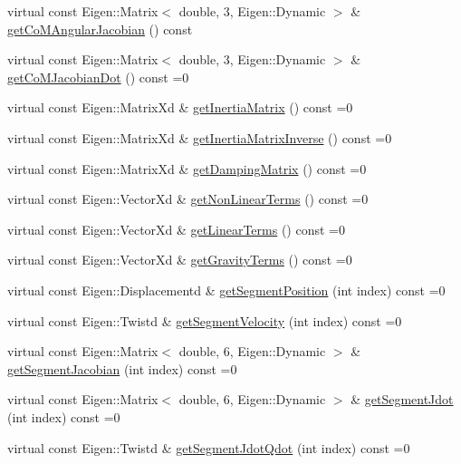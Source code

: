 \begin{DoxyCompactItemize}
\item 
virtual const Eigen\+::\+Matrix$<$ double, 3, Eigen\+::\+Dynamic $>$ \& \hyperlink{classocra_1_1Model_a24406cb7507684963e5aedb6b79940cd}{get\+Co\+M\+Angular\+Jacobian} () const
\item 
virtual const Eigen\+::\+Matrix$<$ double, 3, Eigen\+::\+Dynamic $>$ \& \hyperlink{classocra_1_1Model_abfc71fa0f52145b1df92bdbd0963c926}{get\+Co\+M\+Jacobian\+Dot} () const =0
\item 
virtual const Eigen\+::\+Matrix\+Xd \& \hyperlink{classocra_1_1Model_adf59aeee10c9d3babb05d7249bf71106}{get\+Inertia\+Matrix} () const =0
\item 
virtual const Eigen\+::\+Matrix\+Xd \& \hyperlink{classocra_1_1Model_ac1b1137365a6f6765d41d68bc02f3e62}{get\+Inertia\+Matrix\+Inverse} () const =0
\item 
virtual const Eigen\+::\+Matrix\+Xd \& \hyperlink{classocra_1_1Model_adfbe3160558dd221e7e91e2aad4d5089}{get\+Damping\+Matrix} () const =0
\item 
virtual const Eigen\+::\+Vector\+Xd \& \hyperlink{classocra_1_1Model_ac494939416d3ddcb6e5cf0ece43f3098}{get\+Non\+Linear\+Terms} () const =0
\item 
virtual const Eigen\+::\+Vector\+Xd \& \hyperlink{classocra_1_1Model_a0f9c628cb9e77d63744ccfd164e9beed}{get\+Linear\+Terms} () const =0
\item 
virtual const Eigen\+::\+Vector\+Xd \& \hyperlink{classocra_1_1Model_aef569d0c71ab76665e4a24d178e8243d}{get\+Gravity\+Terms} () const =0
\item 
virtual const Eigen\+::\+Displacementd \& \hyperlink{classocra_1_1Model_ae7afe827a1c09b99d80134a447bd9ccc}{get\+Segment\+Position} (int index) const =0
\item 
virtual const Eigen\+::\+Twistd \& \hyperlink{classocra_1_1Model_a1ee3b57487621c5194b7d6b014308e40}{get\+Segment\+Velocity} (int index) const =0
\item 
virtual const Eigen\+::\+Matrix$<$ double, 6, Eigen\+::\+Dynamic $>$ \& \hyperlink{classocra_1_1Model_a626aed0875f6336c2ecc0147bc8c7d4e}{get\+Segment\+Jacobian} (int index) const =0
\item 
virtual const Eigen\+::\+Matrix$<$ double, 6, Eigen\+::\+Dynamic $>$ \& \hyperlink{classocra_1_1Model_a00cceda96b47bee05cb6366d070d7961}{get\+Segment\+Jdot} (int index) const =0
\item 
virtual const Eigen\+::\+Twistd \& \hyperlink{classocra_1_1Model_a6fe0178b1e8213e39366b2355d0d4de3}{get\+Segment\+Jdot\+Qdot} (int index) const =0

\end{DoxyCompactItemize}
